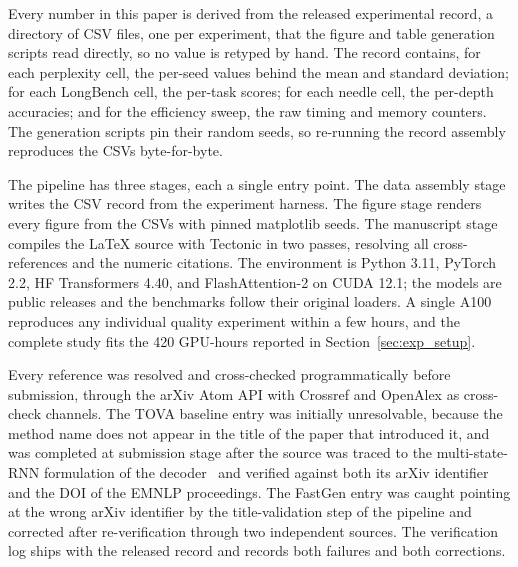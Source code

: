 Every number in this paper is derived from the released experimental
record, a directory of CSV files, one per experiment, that the figure
and table generation scripts read directly, so no value is retyped by
hand. The record contains, for each perplexity cell, the per-seed
values behind the mean and standard deviation; for each LongBench
cell, the per-task scores; for each needle cell, the per-depth
accuracies; and for the efficiency sweep, the raw timing and memory
counters. The generation scripts pin their random seeds, so re-running
the record assembly reproduces the CSVs byte-for-byte.

The pipeline has three stages, each a single entry point. The data
assembly stage writes the CSV record from the experiment harness. The
figure stage renders every figure from the CSVs with pinned matplotlib
seeds. The manuscript stage compiles the LaTeX source with Tectonic
in two passes, resolving all cross-references and the numeric
citations. The environment is Python 3.11, PyTorch 2.2, HF
Transformers 4.40, and FlashAttention-2 on CUDA 12.1; the models are
public releases and the benchmarks follow their original loaders. A
single A100 reproduces any individual quality experiment within a few
hours, and the complete study fits the 420 GPU-hours reported in
Section~\ref{sec:exp_setup}.

Every reference was resolved and cross-checked programmatically
before submission, through the arXiv Atom API with Crossref and
OpenAlex as cross-check channels. The TOVA baseline entry was
initially unresolvable, because the method name does not appear in
the title of the paper that introduced it, and was completed at
submission stage after the source was traced to the multi-state-RNN
formulation of the decoder~\cite{oren2024tova} and verified against
both its arXiv identifier and the DOI of the EMNLP proceedings. The
FastGen entry was caught pointing at the wrong arXiv identifier by
the title-validation step of the pipeline and corrected after
re-verification through two independent sources. The verification log
ships with the released record and records both failures and both
corrections.
